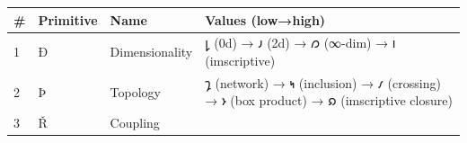 \begin{longtable}[]{@{}llll@{}}
\toprule
\begin{minipage}[b]{0.07\columnwidth}\raggedright
\#\strut
\end{minipage} & \begin{minipage}[b]{0.24\columnwidth}\raggedright
Primitive\strut
\end{minipage} & \begin{minipage}[b]{0.13\columnwidth}\raggedright
Name\strut
\end{minipage} & \begin{minipage}[b]{0.44\columnwidth}\raggedright
Values (low→high)\strut
\end{minipage}\tabularnewline
\midrule
\endhead
\begin{minipage}[t]{0.07\columnwidth}\raggedright
1\strut
\end{minipage} & \begin{minipage}[t]{0.24\columnwidth}\raggedright
\(Ð\)\strut
\end{minipage} & \begin{minipage}[t]{0.13\columnwidth}\raggedright
Dimensionality\strut
\end{minipage} & \begin{minipage}[t]{0.44\columnwidth}\raggedright
𐑛 (0d) → 𐑨 (2d) → 𐑼 (∞-dim) → 𐑦 (imscriptive)\strut
\end{minipage}\tabularnewline
\begin{minipage}[t]{0.07\columnwidth}\raggedright
2\strut
\end{minipage} & \begin{minipage}[t]{0.24\columnwidth}\raggedright
\(Þ\)\strut
\end{minipage} & \begin{minipage}[t]{0.13\columnwidth}\raggedright
Topology\strut
\end{minipage} & \begin{minipage}[t]{0.44\columnwidth}\raggedright
𐑡 (network) → 𐑰 (inclusion) → 𐑥 (crossing) → 𐑶 (box product) → 𐑸
(imscriptive closure)\strut
\end{minipage}\tabularnewline
\begin{minipage}[t]{0.07\columnwidth}\raggedright
3\strut
\end{minipage} & \begin{minipage}[t]{0.24\columnwidth}\raggedright
\(Ř\)\strut
\end{minipage} & \begin{minipage}[t]{0.13\columnwidth}\raggedright
Coupling\strut

\end{minipage}
\end{longtable}
